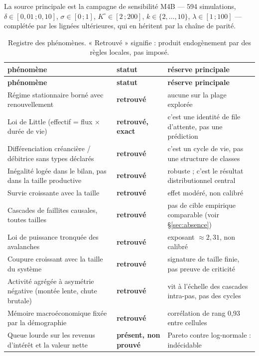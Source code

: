 \documentclass[11pt,a4paper]{article}
\begin{document}
La source principale est la campagne de sensibilité M4B --- 594 simulations,
$\delta \in [0{,}01\,;0{,}10]$, $\sigma \in [0\,;1]$, $K^\circ \in [2\,;200]$,
$k \in \{2,\ldots,10\}$, $\lambda \in [1\,;100]$ --- complétée par les
lignées ultérieures, qui en héritent par la chaîne de parité.

\begin{longtable}{@{}p{}p{}p{}@{}}
\caption{Registre des phénomènes. « Retrouvé » signifie : produit endogènement
par des règles locales, pas imposé.}\\
\toprule
\textbf{phénomène} & \textbf{statut} & \textbf{réserve principale} \\
\midrule
\endfirsthead
\toprule
\textbf{phénomène} & \textbf{statut} & \textbf{réserve principale} \\
\midrule
\endhead
Régime stationnaire borné avec renouvellement & \textbf{retrouvé} &
  aucune sur la plage explorée \\
Loi de Little (effectif = flux × durée de vie) & \textbf{retrouvé, exact} &
  c'est une identité de file d'attente, pas une prédiction \\
Différenciation créancière / débitrice sans types déclarés &
  \textbf{retrouvé} & c'est un cycle de vie, pas une structure de classes \\
Inégalité logée dans le bilan, pas dans la taille productive &
  \textbf{retrouvé} & robuste ; c'est le résultat distributionnel central \\
Survie croissante avec la taille & \textbf{retrouvé} &
  effet modéré, non calibré \\
Cascades de faillites causales, toutes tailles & \textbf{retrouvé} &
  pas de cible empirique comparable (voir §\ref{sec:absence}) \\
Loi de puissance tronquée des avalanches & \textbf{retrouvé} &
  exposant $\approx 2{,}31$, non calibré \\
Coupure croissant avec la taille du système & \textbf{retrouvé} &
  signature de taille finie, pas preuve de criticité \\
Activité agrégée à asymétrie négative (montée lente, chute brutale) &
  \textbf{retrouvé} & vit à l'échelle des cascades intra-pas, pas des cycles \\
Mémoire macroéconomique fixée par la démographie & \textbf{retrouvé} &
  corrélation de rang 0,93 entre cellules \\
Queue lourde sur les revenus d'intérêt et la valeur nette &
  \textbf{présent, non prouvé} & Pareto contre log-normale : indécidable

\end{longtable}
\end{document}
